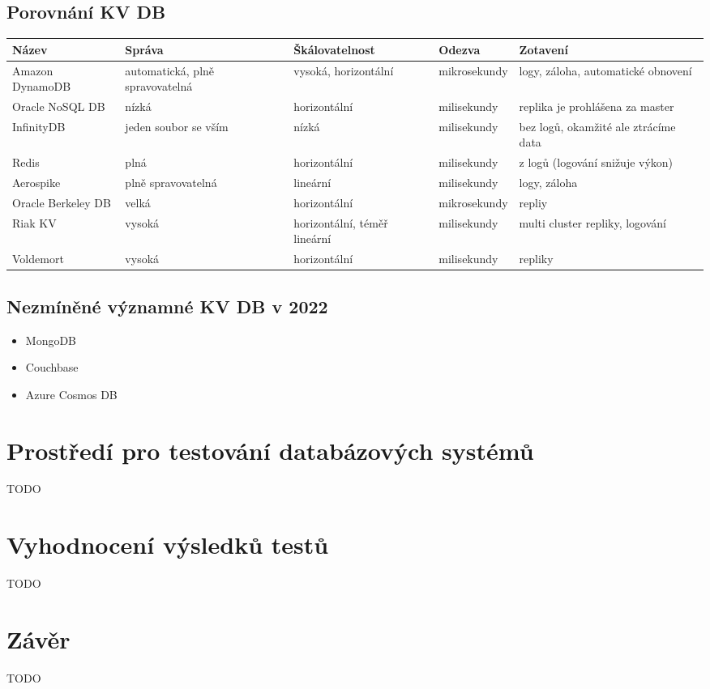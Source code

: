 \documentclass[czech,bachelor,dept460,male,csharp,cpdeclaration]{diploma}
\begin{document}
	\section {Porovnání KV DB}
			\begin{tabular}{ |l||p{2cm} p{2cm} l p{4cm} | } 
				\hline
				Název & Správa & Škálovatelnost & Odezva & Zotavení \\
				\hline
				Amazon DynamoDB & automatická, plně spravovatelná & vysoká, horizontální & mikrosekundy & logy, záloha, automatické obnovení \\
				\hline
				Oracle NoSQL DB & nízká & horizontální & milisekundy & replika je prohlášena za master\\ 
				\hline
				InfinityDB & jeden soubor se vším & nízká & milisekundy & bez logů, okamžité ale ztrácíme data\\ 
				\hline
				Redis & plná & horizontální & milisekundy & z logů (logování snižuje výkon)\\
				\hline
				Aerospike & plně spravovatelná & lineární & milisekundy &  logy, záloha\\
				\hline
				Oracle Berkeley DB & velká & horizontální & mikrosekundy & repliy \\
				\hline
				Riak KV & vysoká & horizontální, téměř lineární & milisekundy & multi cluster repliky, logování\\
				\hline
				Voldemort & vysoká & horizontální & milisekundy &  repliky \\
				\hline
			\end{tabular}


	\section {Nezmíněné významné KV DB v 2022}
		\begin{itemize}
			\item MongoDB
			\item Couchbase
			\item Azure Cosmos DB
		\end{itemize}

	\chapter{Prostředí pro testování databázových systémů}
	
	TODO
	
	\chapter{Vyhodnocení výsledků testů}
	
	TODO
	
	\chapter{Závěr}
	
	TODO
		
	\nocite{*}
	
	\printbibliography[title={Literatura}, heading=bibintoc]
	
\end{document}
